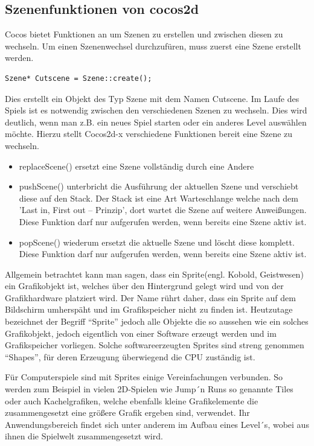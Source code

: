 \subsection{Szenenfunktionen von cocos2d}

Cocos bietet Funktionen an um Szenen zu erstellen und zwischen diesen zu wechseln. Um einen Szenenwechsel durchzufüren, muss zuerst eine Szene erstellt werden.

\begin{lstlisting}[style=singleline]
	Szene* Cutscene = Szene::create();
\end{lstlisting}


Dies erstellt ein Objekt des Typ Szene mit dem Namen Cutscene.
Im Laufe des Spiels ist es  notwendig zwischen den verschiedenen Szenen zu wechseln. Dies wird deutlich, wenn man z.B. ein neues Spiel starten oder ein anderes Level auswählen möchte. Hierzu stellt Cocos2d-x verschiedene Funktionen bereit eine Szene zu wechseln.

\begin{itemize}
\item replaceScene() ersetzt eine Szene vollständig durch eine Andere
\item pushScene() unterbricht die Ausführung der aktuellen Szene und verschiebt diese auf den Stack. Der Stack ist eine Art Warteschlange welche nach dem 'Last in, First out – Prinzip', dort wartet die Szene auf weitere Anweißungen. Diese Funktion darf nur aufgerufen werden, wenn bereits eine Szene aktiv ist.
\item popScene() wiederum ersetzt die aktuelle Szene und löscht diese komplett. Diese Funktion darf nur aufgerufen werden, wenn bereits eine Szene aktiv ist.
\end{itemize}



\label{sec:2_Spriteprinzip}
Allgemein betrachtet kann man sagen, dass ein Sprite(engl. Kobold, Geistwesen) ein Grafikobjekt ist, welches über den Hintergrund gelegt wird und von der Grafikhardware platziert wird. 
Der Name rührt daher, dass ein Sprite auf dem Bildschirm umherspäht und im Grafikspeicher nicht zu finden ist. Heutzutage bezeichnet der Begriff “Sprite” jedoch alle Objekte die so aussehen wie ein solches Grafikobjekt, jedoch eigentlich von einer Software erzeugt werden und im Grafikspeicher vorliegen. 
Solche softwareerzeugten Sprites sind streng genommen “Shapes”, für deren Erzeugung überwiegend die CPU zuständig ist.
 
Für Computerspiele sind mit Sprites einige Vereinfachungen verbunden. So werden zum Beispiel in vielen 2D-Spielen wie Jump´n Runs so genannte Tiles oder auch Kachelgrafiken, welche ebenfalls kleine Grafikelemente die zusammengesetzt eine größere Grafik ergeben sind, verwendet. Ihr Anwendungsbereich findet sich unter anderem im Aufbau eines Level´s, wobei aus ihnen die Spielwelt zusammengesetzt wird.



